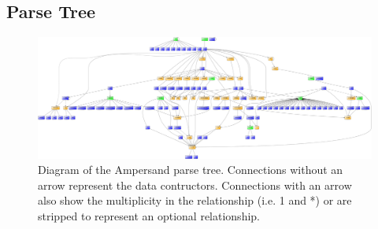 \begin{landscape}

  \section*{Parse Tree}
  \label{app:parse-tree}
  \begin{figure}[htb!]
    \centering
    \includegraphics[width=25.4cm]{Figures/GenParseTree}
    \caption{Diagram of the Ampersand parse tree.\small
      Connections without an arrow represent the data contructors.
      Connections with an arrow also show the multiplicity in the relationship (i.e. 1 and *) or are stripped to represent an optional relationship.
      }
    \label{fig:parse-tree}
  \end{figure}

\end{landscape}